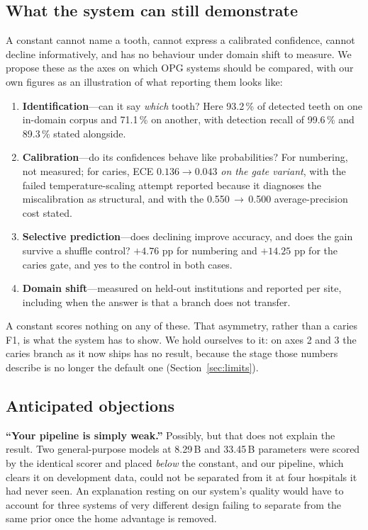 \documentclass[conference]{IEEEtran}
\begin{document}
\subsection{What the system can still demonstrate}
\label{sec:demonstrate}
A constant cannot name a tooth, cannot express a calibrated confidence, cannot
decline informatively, and has no behaviour under domain shift to measure. We
propose these as the axes on which OPG systems should be compared, with our own
figures as an illustration of what reporting them looks like:

\begin{enumerate}
  \item \textbf{Identification}---can it say \emph{which} tooth? Here 93.2\,\% of
        detected teeth on one in-domain corpus and 71.1\,\% on another, with
        detection recall of 99.6\,\% and 89.3\,\% stated alongside.
  \item \textbf{Calibration}---do its confidences behave like probabilities? For
        numbering, not measured; for caries, ECE $0.136 \rightarrow 0.043$ \emph{on the
        gate variant}, with the failed temperature-scaling attempt reported
        because it diagnoses the miscalibration as structural, and with the
        0.550\,$\rightarrow$\,0.500 average-precision cost stated.
  \item \textbf{Selective prediction}---does declining improve accuracy, and does
        the gain survive a shuffle control? $+4.76$ pp for numbering and
        $+14.25$ pp for the caries gate, and yes to the control in both cases.
  \item \textbf{Domain shift}---measured on held-out institutions and reported per
        site, including when the answer is that a branch does not transfer.
\end{enumerate}

A constant scores nothing on any of these. That asymmetry, rather than a caries
F1, is what the system has to show. We hold ourselves to it: on axes 2 and 3 the
caries branch as it now ships has no result, because the stage those numbers
describe is no longer the default one (Section~\ref{sec:limits}).

\subsection{Anticipated objections}
\textbf{``Your pipeline is simply weak.''} Possibly, but that does not explain
the result. Two general-purpose models at 8.29\,B and 33.45\,B parameters were
scored by the identical scorer and placed \emph{below} the constant, and our
pipeline, which clears it on development data, could not be separated from it at
four hospitals it had never seen. An explanation resting on our system's quality
would have to account for three systems of very different design failing to
separate from the same prior once the home advantage is removed.
\end{document}
